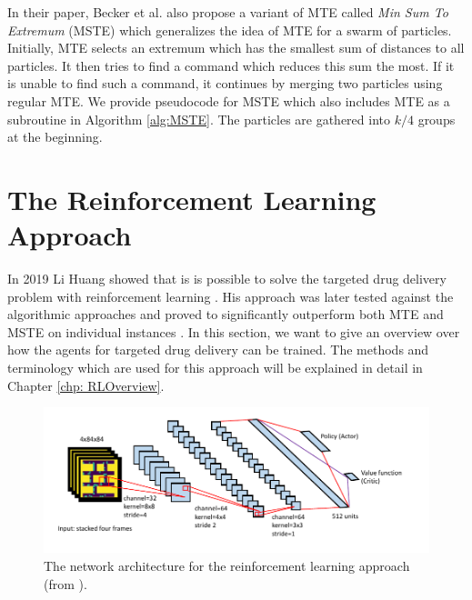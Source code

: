 In their paper, Becker et al. also propose a variant of MTE called \textit{Min Sum To Extremum} (MSTE) which generalizes the idea of MTE for a swarm of particles. Initially, MTE selects an extremum which has the smallest sum of distances to all particles. It then tries to find a command which reduces this sum the most. If it is unable to find such a command, it continues by merging two particles using regular MTE. We provide pseudocode for MSTE which also includes MTE as a subroutine in Algorithm \ref{alg:MSTE}. The particles are gathered into $k/4$ groups at the beginning.

\section{The Reinforcement Learning Approach} \label{sec:TDDRL}
In 2019 Li Huang showed that is is possible to solve the targeted drug delivery problem with reinforcement learning \cite{huang2019}. His approach was later tested against the algorithmic approaches and proved to significantly outperform both MTE and MSTE on individual instances \cite{becker2020}. In this section, we want to give an overview over how the agents for targeted drug delivery can be trained. The methods and terminology which are used for this approach will be explained in detail in Chapter \ref{chp: RLOverview}.

\begin{figure}[ht]
    
    \begin{center}
        \includegraphics[clip, width=0.95\columnwidth]{figures/drugdelivery/Network_Architecture.pdf}
    \end{center}
    
    \caption[Network Architecture for the RL Approach]{The network architecture for the reinforcement learning approach (from \cite{huang2019}).}
    \label{fig:huang_network_architecture}
\end{figure}


